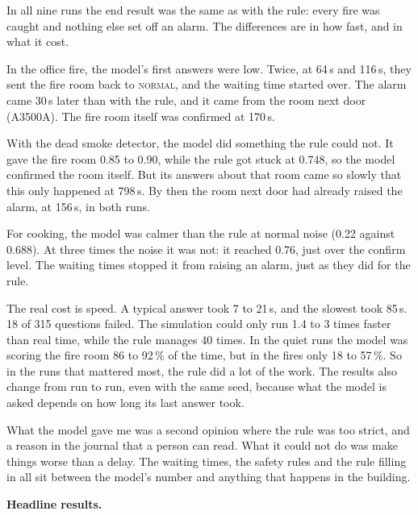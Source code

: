 In all nine runs the end result was the same as with the rule: every fire was
caught and nothing else set off an alarm. The differences are in how fast, and in
what it cost.

In the office fire, the model's first answers were low. Twice, at 64\,s and
116\,s, they sent the fire room back to \textsc{normal}, and the waiting time
started over. The alarm came 30\,s later than with the rule, and it came from the
room next door (A3500A). The fire room itself was confirmed at 170\,s.

With the dead smoke detector, the model did something the rule could not. It gave
the fire room 0.85 to 0.90, while the rule got stuck at 0.748, so the model
confirmed the room itself. But its answers about that room came so slowly that
this only happened at 798\,s. By then the room next door had already raised the
alarm, at 156\,s, in both runs.

For cooking, the model was calmer than the rule at normal noise (0.22 against
0.688). At three times the noise it was not: it reached 0.76, just over the
confirm level. The waiting times stopped it from raising an alarm, just as they
did for the rule.

The real cost is speed. A typical answer took 7 to 21\,s, and the slowest took
85\,s. 18 of 315 questions failed. The simulation could only run 1.4 to 3 times
faster than real time, while the rule manages 40 times. In the quiet runs the
model was scoring the fire room 86 to 92\,\% of the time, but in the fires only 18
to 57\,\%. So in the runs that mattered most, the rule did a lot of the work. The
results also change from run to run, even with the same seed, because what the
model is asked depends on how long its last answer took.

What the model gave me was a second opinion where the rule was too strict, and a
reason in the journal that a person can read. What it could not do was make
things worse than a delay. The waiting times, the safety rules and the rule
filling in all sit between the model's number and anything that happens in the
building.

\textbf{Headline results.}

